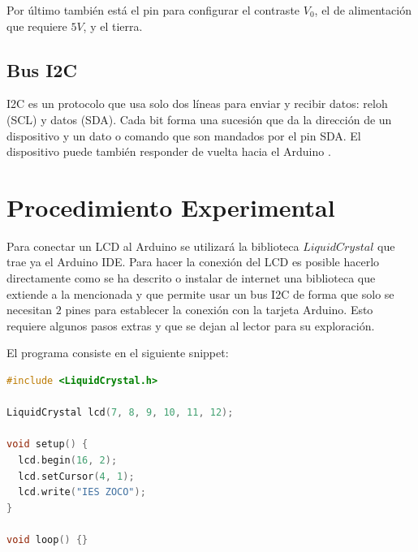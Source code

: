 \documentclass{article}
\begin{document}
    Por último también está el pin para configurar el contraste $V_0$, el de alimentación que requiere $5V$, y el tierra.

    \subsection{Bus I2C}

    I2C es un protocolo que usa solo dos líneas para enviar y recibir datos: reloh (SCL) y datos (SDA). Cada bit forma una sucesión que da la dirección de un dispositivo y un dato o comando que son mandados por el pin SDA. El dispositivo puede también responder de vuelta hacia el Arduino \cite{arduino-docs-i2c-2021}.

    \section{Procedimiento Experimental}

    Para conectar un LCD al Arduino se utilizará la biblioteca $LiquidCrystal$ que trae ya el Arduino IDE. Para hacer la conexión del LCD es posible hacerlo directamente como se ha descrito o instalar de internet una biblioteca que extiende a la mencionada y que permite usar un bus I2C de forma que solo se necesitan $2$ pines para establecer la conexión con la tarjeta Arduino. Esto requiere algunos pasos extras y que se dejan al lector para su exploración.

    \bigbreak

    El programa consiste en el siguiente snippet:

    \begin{lstlisting}[language=C, caption=Arduino Sketch]
#include <LiquidCrystal.h>

LiquidCrystal lcd(7, 8, 9, 10, 11, 12);

void setup() {
  lcd.begin(16, 2);
  lcd.setCursor(4, 1);
  lcd.write("IES ZOCO");
}

void loop() {}
    \end{lstlisting}
\end{document}
